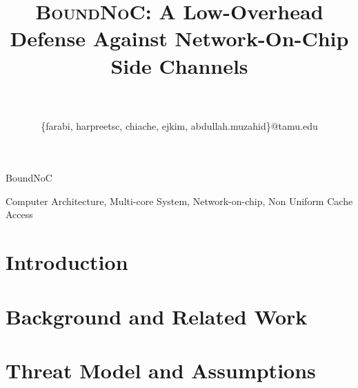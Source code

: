 \documentclass[journal]{IEEEtran}
\newcommand{\scheme}{\textsc{BoundNoC}}
\begin{document}
\title{
\scheme: A Low-Overhead Defense Against Network-On-Chip Side Channels}

\date{}

\author{\\
 \\
\{farabi, harpreetsc, chiache, ejkim, abdullah.muzahid\}@tamu.edu}

%
{BoundNoC}


\maketitle

\begin{abstract}

\end{abstract}

\begin{IEEEkeywords}
Computer Architecture, Multi-core System, Network-on-chip, Non Uniform Cache Access
\end{IEEEkeywords}


\section{Introduction}
\label{sec:intro}



\section{Background and Related Work}
\label{sec:back}



\section{Threat Model and Assumptions}
\label{sec:threatmodel}



% 
\end{document}
